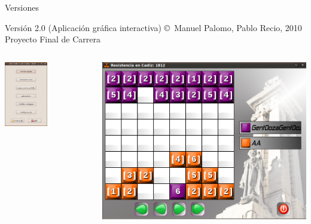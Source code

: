 \documentclass[smaller,spanish,xcolor=svgnames]{beamer}
\begin{document}
\begin{frame}{Versiones}
  \begin{block}{Versión 2.0 (Aplicación gráfica interactiva)}
      \copyright \, Manuel Palomo, Pablo Recio, 2010 \\
      Proyecto Final de Carrera    
  \end{block}

  \begin{columns}[c]
    \begin{center}
      \includegraphics[width=0.5\textwidth]{img/version_41}      
    \end{center}
    \begin{center}
      \includegraphics[width=\textwidth]{img/version_42}          
    \end{center}
  \end{columns}  
\end{frame}
\end{document}
